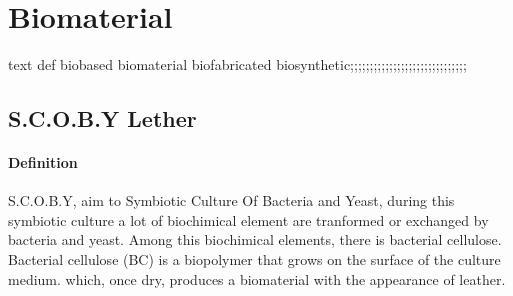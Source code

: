 \section{Biomaterial}
text def biobased biomaterial biofabricated biosynthetic;;;;;;;;;;;;;;;;;;;;;;;;;;;;;;

\subsection{S.C.O.B.Y Lether} 
\paragraph[short]{Definition } 
S.C.O.B.Y, aim to Symbiotic Culture Of Bacteria and Yeast, during this symbiotic culture a lot of biochimical element are tranformed or exchanged by bacteria and yeast.
Among this biochimical elements, there is bacterial cellulose. Bacterial cellulose (BC) is a biopolymer that grows on the surface of the culture medium. which, once dry, produces a biomaterial with the appearance of leather. 

